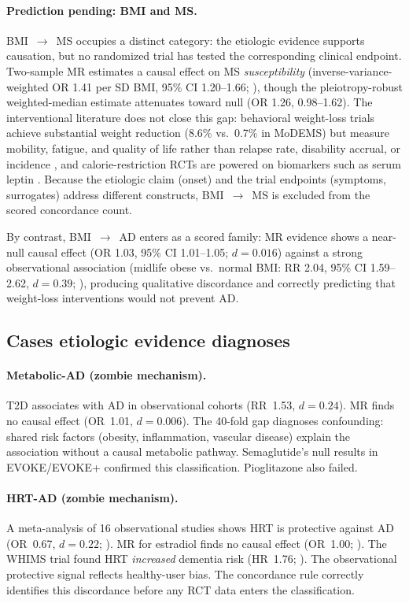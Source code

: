 \documentclass[11pt]{article}
\begin{document}
\paragraph{Prediction pending: BMI and MS.}
BMI~$\to$~MS occupies a distinct category: the etiologic evidence supports causation, but no randomized trial has tested the corresponding clinical endpoint. Two-sample MR estimates a causal effect on MS \emph{susceptibility} (inverse-variance-weighted OR 1.41 per SD BMI, 95\% CI 1.20--1.66; \citealp{mokry2016obesity}), though the pleiotropy-robust weighted-median estimate attenuates toward null (OR 1.26, 0.98--1.62). The interventional literature does not close this gap: behavioral weight-loss trials achieve substantial weight reduction (8.6\% vs.\ 0.7\% in MoDEMS) but measure mobility, fatigue, and quality of life rather than relapse rate, disability accrual, or incidence \citep{bruce2023modems}, and calorie-restriction RCTs are powered on biomarkers such as serum leptin \citep{ghezzi2025icr}. Because the etiologic claim (onset) and the trial endpoints (symptoms, surrogates) address different constructs, BMI~$\to$~MS is excluded from the scored concordance count.

By contrast, BMI~$\to$~AD enters as a scored family: MR evidence shows a near-null causal effect (OR 1.03, 95\% CI 1.01--1.05; $d = 0.016$) against a strong observational association (midlife obese vs.\ normal BMI: RR 2.04, 95\% CI 1.59--2.62, $d = 0.39$; \citealp{anstey2011}), producing qualitative discordance and correctly predicting that weight-loss interventions would not prevent AD.

\subsection{Cases etiologic evidence diagnoses}

\paragraph{Metabolic-AD (zombie mechanism).} T2D associates with AD in observational cohorts (RR~1.53, $d = 0.24$). MR finds no causal effect (OR~1.01, $d = 0.006$). The 40-fold gap diagnoses confounding: shared risk factors (obesity, inflammation, vascular disease) explain the association without a causal metabolic pathway. Semaglutide's null results in EVOKE/EVOKE+ confirmed this classification. Pioglitazone also failed.

\paragraph{HRT-AD (zombie mechanism).} A meta-analysis of 16 observational studies shows HRT is protective against AD (OR~0.67, $d = 0.22$; \citealp{song2020}). MR for estradiol finds no causal effect (OR~1.00; \citealp{barth2025}). The WHIMS trial found HRT \emph{increased} dementia risk (HR~1.76; \citealp{shumaker2003}). The observational protective signal reflects healthy-user bias. The concordance rule correctly identifies this discordance before any RCT data enters the classification.
\end{document}
